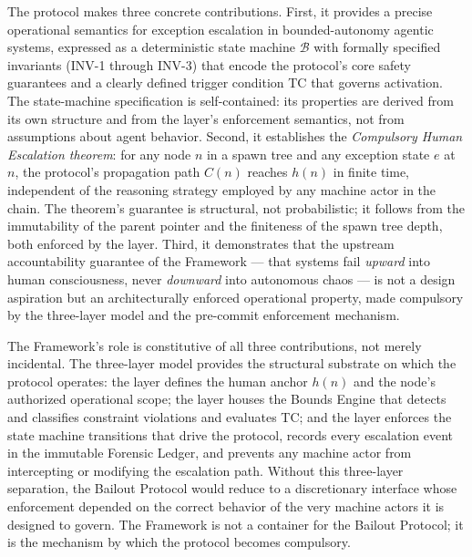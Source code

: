 The protocol makes three concrete contributions. First, it provides a precise operational semantics for exception escalation in bounded-autonomy agentic systems, expressed as a deterministic state machine $\mathcal{B}$ with formally specified invariants (INV-1 through INV-3) that encode the protocol's core safety guarantees and a clearly defined trigger condition TC that governs activation. The state-machine specification is self-contained: its properties are derived from its own structure and from the \fact{} layer's enforcement semantics, not from assumptions about agent behavior. Second, it establishes the \textit{Compulsory Human Escalation theorem}: for any node $n$ in a \bxthree{} spawn tree and any exception state $e$ at $n$, the protocol's propagation path $C(n)$ reaches $h(n)$ in finite time, independent of the reasoning strategy employed by any machine actor in the chain. The theorem's guarantee is structural, not probabilistic; it follows from the immutability of the parent pointer and the finiteness of the spawn tree depth, both enforced by the \fact{} layer. Third, it demonstrates that the upstream accountability guarantee of the \bxthree{} Framework --- that systems fail \emph{upward} into human consciousness, never \emph{downward} into autonomous chaos --- is not a design aspiration but an architecturally enforced operational property, made compulsory by the three-layer model and the pre-commit enforcement mechanism.

The \bxthree{} Framework's role is constitutive of all three contributions, not merely incidental. The three-layer model provides the structural substrate on which the protocol operates: the \purpose{} layer defines the human anchor $h(n)$ and the node's authorized operational scope; the \bounds{} layer houses the Bounds Engine that detects and classifies constraint violations and evaluates TC; and the \fact{} layer enforces the state machine transitions that drive the protocol, records every escalation event in the immutable Forensic Ledger, and prevents any machine actor from intercepting or modifying the escalation path. Without this three-layer separation, the Bailout Protocol would reduce to a discretionary interface whose enforcement depended on the correct behavior of the very machine actors it is designed to govern. The \bxthree{} Framework is not a container for the Bailout Protocol; it is the mechanism by which the protocol becomes compulsory.

